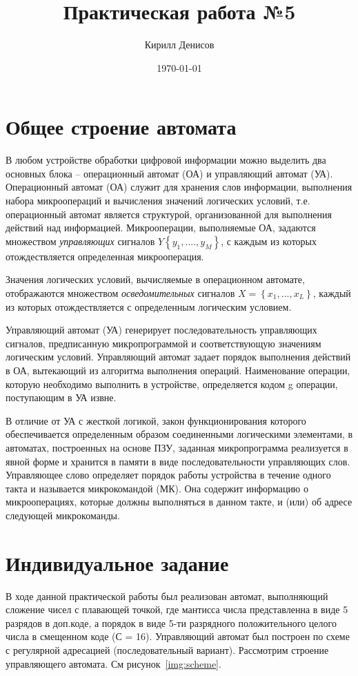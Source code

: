 \documentclass[a4paper,14pt]{extarticle}
\author{Кирилл Денисов}
\title{Практическая работа №5}
\date{\today}
\newcommand{\pathToCommonFolder}{../../Common}
\begin{document}
	\thispagestyle{empty}
	
	
	
	\newpage
	\tableofcontents
	\newpage
	
\section{Общее строение автомата}
В любом устройстве обработки цифровой информации можно выделить два основных блока – операционный автомат (ОА) и управляющий автомат (УА). Операционный автомат (ОА) служит для хранения слов информации, выполнения набора микроопераций и вычисления значений логических условий, т.е. операционный автомат является структурой, организованной для выполнения действий над информацией. Микрооперации, выполняемые ОА, задаются множеством \textit{управляющих} сигналов $Y\left\{y_1,....,y_M\right\}$, с каждым из которых отождествляется определенная микрооперация.

Значения логических условий, вычисляемые в операционном автомате, отображаются множеством \textit{осведомительных} сигналов $X=\left\{x_1,...,x_L\right\}$, каждый из которых отождествляется с определенным логическим условием.

Управляющий автомат (УА) генерирует последовательность управляющих сигналов, предписанную микропрограммой и соответствующую значениям логическим условий. Управляющий автомат задает порядок выполнения действий в ОА, вытекающий из алгоритма выполнения операций. Наименование операции, которую необходимо выполнить в устройстве, определяется кодом g операции, поступающим в УА извне. 

В отличие от УА с жесткой логикой, закон функционирования которого обеспечивается определенным образом соединенными логическими элементами, в автоматах, построенных на основе ПЗУ, заданная микропрограмма реализуется в явной форме и хранится в памяти в виде последовательности управляющих слов. Управляющее слово определяет порядок работы устройства в течение одного такта и называется микрокомандой (МК). Она содержит информацию о микрооперациях, которые должны выполняться в данном такте, и (или) об адресе следующей микрокоманды.
\section{Индивидуальное задание}
В ходе данной практической работы был реализован автомат, выполняющий сложение чисел с плавающей точкой, где мантисса числа представленна в виде 5 разрядов в доп.коде, а порядок в виде 5-ти разрядного положительного целого числа в смещенном коде (С = 16). Управляющий автомат был построен по схеме с регулярной адресацией (последовательный вариант). Рассмотрим строение управляющего автомата. См рисунок~\ref{img:scheme}.
\end{document}
